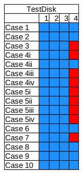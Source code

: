 \begin{figure}[h!]
\begin{subfigure}{0.17\linewidth}
    \end{subfigure}~~
    \begin{subfigure}{0.17\linewidth}
        \includegraphics[width=\linewidth]{fig/testdisk_results_fat.png}

\end{subfigure}
\end{figure}
